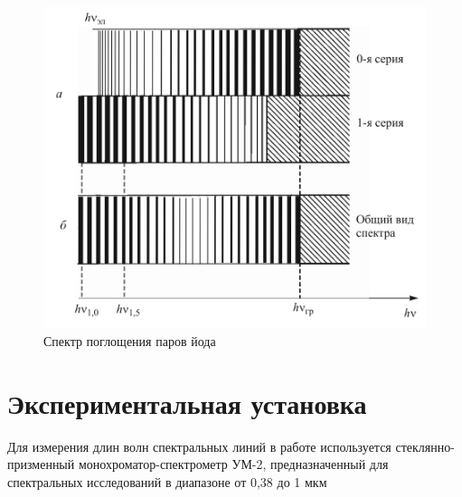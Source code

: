 \documentclass[a4paper]{article}
\begin{document}
\begin{figure}[H]
    \begin{center}
    \includegraphics[scale = 0.38]{p6.png}
    \caption{Спектр поглощения паров йода}
    \label{p6}
    \end{center}
\end{figure}


\section{Экспериментальная установка}
Для измерения длин волн спектральных линий в работе используется стеклянно-призменный 
монохроматор-спектрометр УМ-2, предназначенный для спектральных исследований в диапазоне 
от 0,38 до 1 мкм
\end{document}
